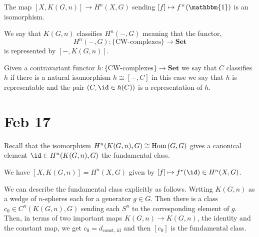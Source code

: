 \documentclass[12pt]{extarticle}
\begin{document}
\begin{theorem}
The map $[X, K(G, n)] \to H^n(X, G)$ sending $[f] \mapsto f^\times(\mathbbm{1})$ is an isomorphism. 
\end{theorem}

\begin{remark}
We say that $K(G, n)$ classifies $H^n(-,G)$ meaning that the functor,
\[ H^n(-,G) : \{ \text{CW-complexes} \} \to \mathbf{Set} \]
 is represented by $[-, K(G,n)]$.
\end{remark}

\begin{definition}
Given a contravariant functor $h : \{ \text{CW-complexes} \} \to \mathbf{Set}$ we say that $C$ classifies $h$ if there is a natural isomorphism $h \cong [-, C]$ in this case we say that $h$ is representable and the pair $(C, \id \in h(C))$ is a representation of $h$. 
\end{definition}

\section{Feb 17}

Recall that the isomorphism $H^n(K(G, n), G) \cong \mathrm{Hom}\left( G, G \right)$ gives a canonical element $\id \in H^n(K(G,n), G)$ the fundamental class.

\begin{thm}
We have $[X, K(G, n)] = H^n(X, G)$ given by $[f] \mapsto f^*(\id) \in H^n(X, G)$. 
\end{thm}

\begin{rmk}
We can describe the fundamental class explicitly as follows. Wrtting $K(G, n)$ as a wedge of $n$-spheres each for a generator $g \in G$. Then there is a class $c_0 \in C^n(K(G,n), G)$ sending each $S^n$ to the corresponding element of $g$. Then, in terms of two important maps $K(G, n) \to K(G,n)$, the identity and the constant map, we get $c_0 = d_{\text{const, id}}$ and then $[c_0]$ is the fundamental class.
\end{rmk}
\end{document}
